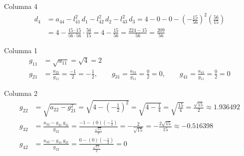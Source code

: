 Columna 4
\begin{align*}
	d_4 &= a_{44} - l_{41}^2\,d_1 - l_{42}^2\,d_2 - l_{43}^2\,d_3
	= 4 - 0 - 0 - \left(-\tfrac{15}{56}\right)^2\left(\tfrac{56}{15}\right)\\
	&= 4 - \tfrac{15\cdot 15}{56\cdot 56}\cdot\tfrac{56}{15} = 4 - \tfrac{15}{56} = \tfrac{224 - 15}{56} = \tfrac{209}{56}
\end{align*}



Columna 1
\begin{align*}
	g_{11} &= \sqrt{a_{11}} = \sqrt4 = 2\\
	g_{21} &= \frac{a_{21}}{g_{11}} = \frac{-1}{2} = -\frac12, \qquad
	g_{31} = \frac{a_{31}}{g_{11}} = \frac{0}{2} = 0, \qquad
	g_{41} = \frac{a_{41}}{g_{11}} = \frac{0}{2} = 0
\end{align*}

Columna 2
\begin{align*}
	g_{22} &= \sqrt{a_{22} - g_{21}^2} = \sqrt{4 - \left(-\tfrac12\right)^2} = \sqrt{4 - \tfrac14}
	= \sqrt{\tfrac{15}{4}} = \frac{\sqrt{15}}{2} \approx 1.936492\\
	g_{32} &= \frac{a_{32} - g_{31}\,g_{21}}{g_{22}} = \frac{-1 - (0)\left(-\frac12\right)}{\frac{\sqrt{15}}{2}}
	= -\frac{2}{\sqrt{15}} = -\frac{2\sqrt{15}}{15} \approx -0.516398\\
	g_{42} &= \frac{a_{42} - g_{41}\,g_{21}}{g_{22}} = \frac{0 - (0)\left(-\frac12\right)}{\frac{\sqrt{15}}{2}} = 0
\end{align*}

